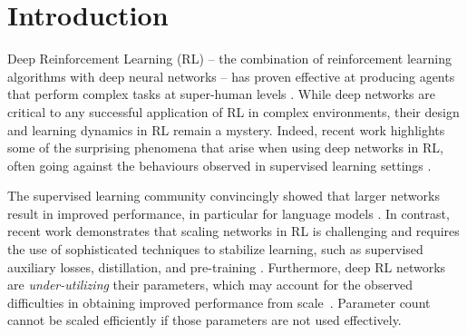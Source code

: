 \documentclass{article}
\theoremstyle{plain}
\theoremstyle{definition}
\theoremstyle{remark}
\begin{document}
\printAffiliationsAndNotice{\icmlEqualContribution} %



\ifarxiv
\else
    
\fi

\section{Introduction}
\label{sec:introduction}
Deep Reinforcement Learning (RL) -- the combination of reinforcement learning algorithms with deep neural networks -- has proven effective at producing agents that perform complex tasks at super-human levels \citep{mnih2015humanlevel, berner2019dota, vinyals2019grandmaster, fawzi2022discovering, Bellemare2020AutonomousNO}. While deep networks are critical to any successful application of RL in complex environments, their design and learning dynamics in RL remain a mystery. Indeed, recent work highlights some of the surprising phenomena that arise when using deep networks in RL, often going against the behaviours observed in supervised learning settings \citep{ostrovski2021tandem,kumar2021implicit, lyle2022understanding,graesser2022state,nikishin22primacy,sokar2023dormant,ceron2023small}.


The supervised learning community convincingly showed that larger networks result in improved performance, in particular for language models \citep{kaplan2020scaling}. In contrast, recent work demonstrates that scaling networks in RL is challenging and requires the use of  sophisticated techniques to stabilize learning, such as supervised auxiliary losses, distillation, and pre-training \citep{farebrother2022proto, taiga2022investigating, schwarzer23bbf}. Furthermore, deep RL networks are {\em under-utilizing} their parameters, which may account for the observed difficulties in obtaining improved performance from scale~\citep{kumar2021implicit, lyle2022understanding, sokar2023dormant}. Parameter count cannot be scaled efficiently if those parameters are not used effectively.
\end{document}
